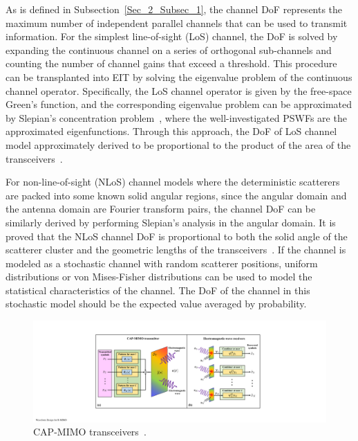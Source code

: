 \documentclass[journal,twocolumn]{IEEEtran}
\begin{document}
As is defined in Subsection~\ref{Sec_2_Subsec_1}, the channel DoF represents the maximum number of independent parallel channels that can be used to transmit information. 
For the simplest line-of-sight (LoS) channel, the DoF is solved by expanding the continuous channel on a series of orthogonal sub-channels and counting the number of channel gains that exceed a threshold. 
This procedure can be transplanted into EIT by solving the eigenvalue problem of the continuous channel operator. 
Specifically, the LoS channel operator is given by the free-space Green's function, and the corresponding eigenvalue problem can be approximated by Slepian's concentration problem~\cite{miller2000communicating}, where the well-investigated PSWFs are the approximated eigenfunctions.  
Through this approach, the DoF of LoS channel model approximately derived to be  proportional to the product of the area of the transceivers~\cite{pizzo2022nyquist,miller2000communicating}. 

For non-line-of-sight (NLoS) channel models where the deterministic scatterers are packed into some known solid angular regions, since the angular domain and the antenna domain are Fourier transform pairs, the channel DoF can be similarly derived by performing Slepian's analysis in the angular domain. It is proved that the NLoS channel DoF is proportional to both the solid angle of the scatterer cluster and the geometric lengths of the transceivers~\cite{poon2005degrees}.  
If the channel is modeled as a stochastic channel with random scatterer positions, uniform distributions or von Mises-Fisher distributions can be used to model the statistical characteristics of the channel. 
The DoF of the channel in this stochastic model should be the expected value averaged by probability.

\begin{figure}[ht]
	\centering 
	\includegraphics[width=0.85\linewidth]{figures/CAPMIMO.pdf} 
	\caption{CAP-MIMO transceivers~\cite{zhang2022pdma}.  }
	\label{fig:CAPMIMO}
\end{figure}
\end{document}
